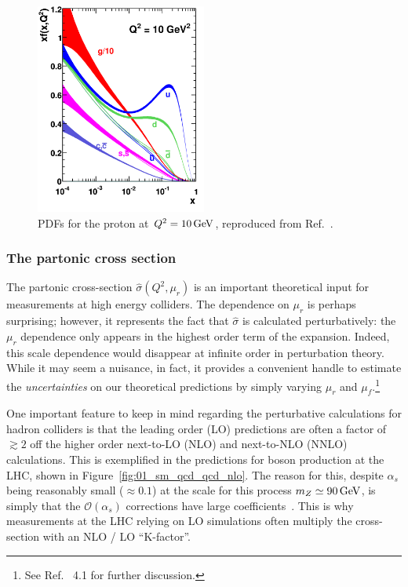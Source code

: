 \begin{figure}
	\centering
	\includegraphics[width=0.5\textwidth]{figures/01-SM-03-SM/qcd/The-MSTW-2008-proton-PDFs.png}
	\caption{PDFs for the proton at $Q^2 = 10 \,\text{Ge\hspace{-.08em}V}$, reproduced from Ref.~\cite{Krasny2010}.}
	\label{fig:01_sm_qcd_pdfs}
\end{figure}

\subsubsection{The partonic cross section}

The partonic cross-section $\hat\sigma(Q^2, \mu_r)$ is an important theoretical input for measurements at high energy colliders.
The dependence on $\mu_r$ is perhaps surprising; however, it represents the fact that $\hat\sigma$ is calculated perturbatively: the $\mu_r$ dependence only appears in the highest order term of the expansion.
Indeed, this scale dependence would disappear at infinite order in perturbation theory.
While it may seem a nuisance, in fact, it provides a convenient handle to estimate the \textit{uncertainties} on our theoretical predictions by simply varying $\mu_r$ and $\mu_f$.\footnote{See Ref.~\cite{Salam:2010zt} 4.1 for further discussion.}

One important feature to keep in mind regarding the perturbative calculations for hadron colliders is that the leading order (LO) predictions are often a factor of $\gtrsim 2$ off the higher order next-to-LO (NLO) and next-to-NLO (NNLO) calculations.
This is exemplified in the predictions for \PZ boson production at the LHC, shown in Figure~\ref{fig:01_sm_qcd_qcd_nlo}.
The reason for this, despite $\alpha_s$ being reasonably small ($\approx 0.1$) at the scale for this process $m_Z \simeq 90\,\text{Ge\hspace{-.08em}V}$, is simply that the $\mathcal O(\alpha_s)$ corrections have large coefficients~\cite{Salam:2010zt}.
This is why measurements at the LHC relying on LO simulations often multiply the cross-section with an NLO / LO ``K-factor''.

